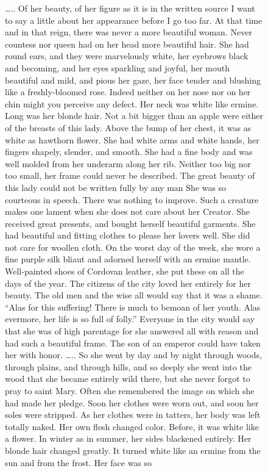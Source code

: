 \documentclass[
  letterpaper,
  DIV=11,
  numbers=noendperiod,
  oneside]{scrreprt}
\begin{document}
\begin{figure}
\ldots.. Of her beauty, of her figure as it is in the written source I
want to say a little about her appearance before I go too far. At that
time and in that reign, there was never a more beautiful woman. Never
countess nor queen had on her head more beautiful hair. She had round
ears, and they were marvelously white, her eyebrows black and becoming,
and her eyes sparkling and joyful, her mouth beautiful and mild, and
pious her gaze, her face tender and blushing like a freshly-bloomed
rose. Indeed neither on her nose nor on her chin might you perceive any
defect. Her neck was white like ermine. Long was her blonde hair. Not a
bit bigger than an apple were either of the breasts of this lady. Above
the bump of her chest, it was as white as hawthorn flower. She had white
arms and white hands, her fingers shapely, slender, and smooth. She had
a fine body and was well molded from her underarm along her rib. Neither
too big nor too small, her frame could never be described. The great
beauty of this lady could not be written fully by any man She was so
courteous in speech. There was nothing to improve. Such a creature makes
one lament when she does not care about her Creator. She received great
presents, and bought herself beautiful garments. She had beautiful and
fitting clothes to please her lovers well. She did not care for woollen
cloth. On the worst day of the week, she wore a fine purple silk bliaut
and adorned herself with an ermine mantle. Well-painted shoes of
Cordovan leather, she put these on all the days of the year. The
citizens of the city loved her entirely for her beauty. The old men and
the wise all would say that it was a shame. ``Alas for this suffering!
There is much to bemoan of her youth. Alas evermore, her life is so full
of folly.'' Everyone in the city would say that she was of high
parentage for she answered all with reason and had such a beautiful
frame. The son of an emperor could have taken her with honor. \ldots..
So she went by day and by night through woods, through plains, and
through hills, and so deeply she went into the wood that she became
entirely wild there, but she never forgot to pray to saint Mary. Often
she remembered the image on which she had made her pledge. Soon her
clothes were worn out, and soon her soles were stripped. As her clothes
were in tatters, her body was left totally naked. Her own flesh changed
color. Before, it was white like a flower. In winter as in summer, her
sides blackened entirely. Her blonde hair changed greatly. It turned
white like an ermine from the sun and from the frost. Her face was so

\end{figure}
\end{document}
